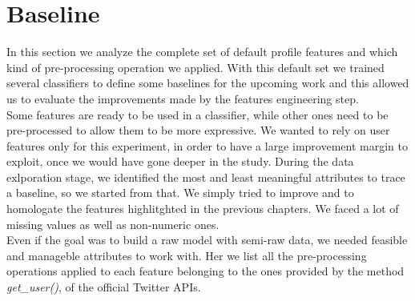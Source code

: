 \section{Baseline}
In this section we analyze the complete set of default profile features and which kind of pre-processing operation we applied. With this default set we trained several classifiers to define some baselines for the upcoming work and this allowed us to evaluate the improvements made by the features engineering step.\\
Some features are ready to be used in a classifier, while other ones need to be pre-processed to allow them to be more expressive.
We wanted to rely on user features only for this experiment, in order to have a large improvement margin to exploit, once we would have gone deeper in the study.
During the data exlporation stage, we identified the most and least meaningful attributes to trace a baseline, so we started from that. We simply tried to improve and to homologate the features highlitghted in the previous chapters.
We faced a lot of missing values as well as non-numeric ones.\\
Even if the goal was to build a raw model with semi-raw data, we needed feasible and manageble attributes to work with.
Her we list all the pre-processing operations applied to each feature belonging to the ones provided by the method \textit{get\_user()}, of the official Twitter APIs.
\newpage
\small

